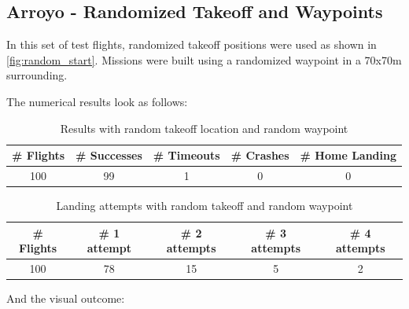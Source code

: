 \subsection{Arroyo - Randomized Takeoff and Waypoints}\label{subsec:compl_rand}

    In this set of test flights, randomized takeoff positions were used as shown in \cref{fig:random_start}. Missions were built using a randomized waypoint in a 70x70m surrounding.

    The numerical results look as follows:

    \begin{table}[h]
        \begin{center}
         \caption{Results with random takeoff location and random waypoint}\vspace{1ex}
         \label{tab:result_complete_rand}
         \begin{tabular}{|c|c|c|c|c|}
         \hline
         \# Flights & \# Successes & \# Timeouts & \# Crashes & \# Home Landing\\ \hline \hline
         100 & 99 & 1 & 0 & 0 \\
         \hline
         \end{tabular}
        \end{center}
    \end{table}
    \begin{table}[h]
        \begin{center}
         \caption{Landing attempts with random takeoff and random waypoint}\vspace{1ex}
         \label{tab:land_nums_complete_rand}
         \begin{tabular}{|c|c|c|c|c|}
         \hline
         \# Flights & \# 1 attempt & \# 2 attempts & \# 3 attempts & \# 4 attempts\\ \hline \hline
         100 & 78 & 15 & 5 & 2 \\
         \hline
         \end{tabular}
        \end{center}
    \end{table}

    And the visual outcome:

